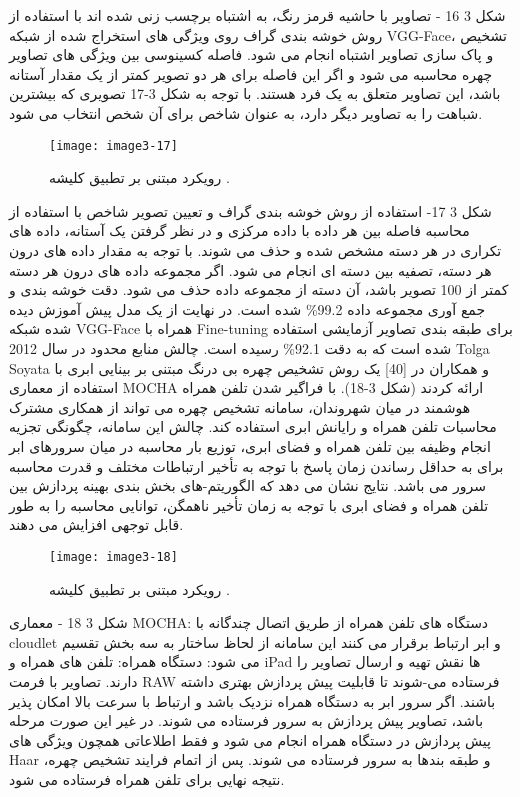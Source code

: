 شکل ‏3 16 - تصاویر با حاشیه قرمز رنگ، به اشتباه برچسب زنی شده اند
با استفاده از روش خوشه بندی گراف  روی ویژگی های استخراج شده از شبكه VGG-Face، تشخیص و پاک سازی تصاویر اشتباه انجام می شود. فاصله کسینوسی بین ویژگی های تصاویر چهره محاسبه می شود و اگر این فاصله برای هر دو تصویر کمتر از یک مقدار آستانه باشد، این تصاویر متعلق به یک فرد هستند. با توجه به شکل 3-17 تصویری که بیشترین شباهت را به تصاویر دیگر دارد، به عنوان شاخص برای آن شخص انتخاب می شود.
 \begin{figure}[h]
\centering
  \texttt{[image: image3-17]}
  \caption{رویکرد مبتنی بر تطبیق کلیشه  \cite{ref1}.}
  \label{image2-1}
\end{figure}
شکل ‏3 17- استفاده از روش خوشه بندی گراف و تعیین تصویر شاخص
	با استفاده از محاسبه فاصله بین هر داده با داده مرکزی و در نظر گرفتن یک آستانه، داده های تكراری در هر دسته مشخص شده و حذف  می شوند.
	با توجه به مقدار داده های درون هر دسته، تصفیه بین دسته ای انجام می شود. اگر مجموعه داده های درون هر دسته کمتر از 100 تصویر باشد، آن دسته از مجموعه داده حذف می شود.
دقت خوشه بندی و جمع آوری مجموعه داده 99.2\% شده است. در نهایت از یک مدل پیش آموزش دیده شده شبكه VGG-Face همراه با Fine-tuning برای طبقه بندی تصاویر آزمایشی استفاده شده است که به دقت 92.1\% رسیده است.
	چالش منابع محدود
در سال 2012 Tolga Soyata و همکاران در [40] یک روش تشخیص چهره بی درنگ مبتنی بر بینایی ابری  با استفاده از معماری MOCHA ارائه کردند (شکل 3-18). با فراگیر شدن تلفن همراه هوشمند در میان شهروندان، سامانه تشخیص چهره می تواند از همکاری مشترک محاسبات تلفن همراه و رایانش ابری استفاده کند. چالش این سامانه، چگونگی تجزیه انجام وظیفه بین تلفن همراه و فضای ابری، توزیع بار محاسبه در میان سرورهای ابر برای به حداقل رساندن زمان پاسخ با توجه به تأخیر ارتباطات مختلف و قدرت محاسبه سرور می باشد. نتایج نشان می دهد که الگوریتم-های بخش بندی بهینه پردازش بین تلفن همراه و فضای ابری با توجه به زمان تأخیر ناهمگن، توانایی محاسبه را به طور قابل توجهی افزایش می دهند. 
 \begin{figure}[h]
\centering
  \texttt{[image: image3-18]}
  \caption{رویکرد مبتنی بر تطبیق کلیشه  \cite{ref1}.}
  \label{image2-1}
\end{figure}
شکل ‏3 18 - معماری MOCHA: دستگاه های تلفن همراه از طریق اتصال چندگانه با cloudlet و ابر ارتباط برقرار می کنند
این سامانه از لحاظ ساختار به سه بخش تقسیم می شود:
دستگاه همراه: تلفن های همراه و iPad ها نقش تهیه و ارسال تصاویر را دارند. تصاویر با فرمت RAW فرستاده می-شوند تا قابلیت پیش پردازش بهتری داشته باشند. اگر سرور ابر به دستگاه همراه نزدیک باشد و ارتباط با سرعت بالا امکان پذیر باشد، تصاویر پیش پردازش به سرور فرستاده می شوند. در غیر این صورت مرحله پیش پردازش در دستگاه همراه انجام می شود و فقط اطلاعاتی همچون ویژگی های Haar و طبقه بندها به سرور فرستاده  می شوند. پس از اتمام فرایند تشخیص چهره، نتیجه نهایی برای تلفن همراه فرستاده می شود.
